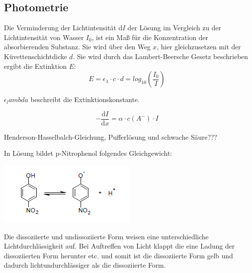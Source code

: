 \documentclass[12pt,a4paper,titlepage,headinclude,bibtotoc]{scrartcl}
\begin{document}
\subsection{Photometrie}
Die Verminderung der Lichtintensität $\mathrm{d}I$ der Lösung im Vergleich zu der Lichtintensität von Wasser $I_0$, ist ein Maß für die Konzentration der absorbierenden Substanz. Sie wird über den Weg $x$, hier gleichzusetzen mit der Küvettenschichtdicke $d$. Sie wird durch das Lambert-Beersche Gesetz beschrieben ergibt die Extinktion $E$:\\

\begin{equation}
E = \epsilon _{\lambda} \cdot c \cdot d = log_{10}\left( \frac{I_0}{I}\right)
\end{equation}

$\epsilon_lambda$ beschreibt die Extinktionskonstante. 








\begin{equation}
-\frac{\mathrm{d}I}{\mathrm{d}x} = \alpha \cdot c(A^-) \cdot I
\end{equation}








Henderson-Hasselbalch-Gleichung, Pufferlösung und schwache Säure???








In Lösung bildet p-Nitrophenol folgendes Gleichgewicht:










\begin{center}

\includegraphics[scale=1]{Strukturformel}

\end{center}
Die dissoziierte und undissoziierte Form weisen eine unterschiedliche Lichtdurchlässigkeit auf.
Bei Auftreffen von Licht klappt die eine Ladung der dissoziierten Form herunter etc. und somit ist die dissoziierte Form gelb und dadurch lichtundurchlässiger als die dissoziierte Form.
\end{document}

